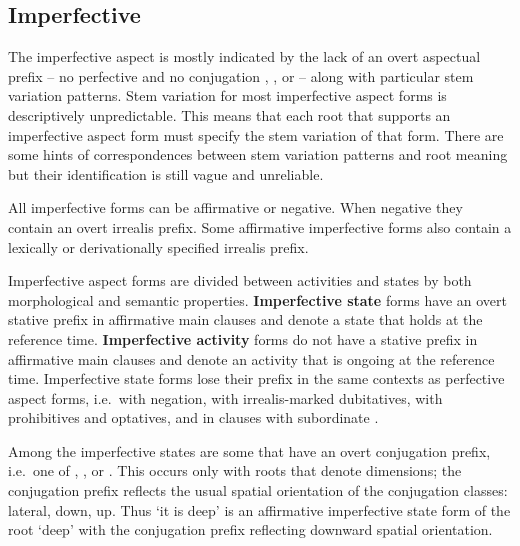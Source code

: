 \clearpage
\subsection{Imperfective}\label{sec:asp-impfv}

\begin{multicols}{2}
\noindent
The imperfective aspect is mostly indicated by the lack of an overt aspectual prefix – no perfective  and no conjugation , , or  – along with particular stem variation patterns.
Stem variation for most imperfective aspect forms is descriptively unpredictable.
This means that each root that supports an imperfective aspect form must specify the stem variation of that form.
There are some hints of correspondences between stem variation patterns and root meaning but their identification is still vague and unreliable.

All imperfective forms can be affirmative or negative.
When negative they contain an overt  irrealis prefix.
Some affirmative imperfective forms also contain a lexically or derivationally specified irrealis prefix.

Imperfective aspect forms are divided between activities and states by both morphological and semantic properties.
\textbf{Imperfective state} forms have an overt  stative prefix in affirmative main clauses and denote a state that holds at the reference time.
\textbf{Imperfective activity} forms do not have a stative prefix in affirmative main clauses and denote an activity that is ongoing at the reference time.
Imperfective state forms lose their  prefix in the same contexts as perfective aspect forms, i.e.\ with negation, with irrealis-marked dubitatives, with prohibitives and optatives, and in clauses with subordinate  \parencite[218–228]{crippen:2019}.

Among the imperfective states are some that have an overt conjugation prefix, i.e.\ one of , , or .
This occurs only with roots that denote dimensions; the conjugation prefix reflects the usual spatial orientation of the conjugation classes:  lateral,  down,  up.
Thus  ‘it is deep’ is an affirmative imperfective state form of the root  ‘deep’ with the  conjugation prefix reflecting downward spatial orientation.
\end{multicols}

